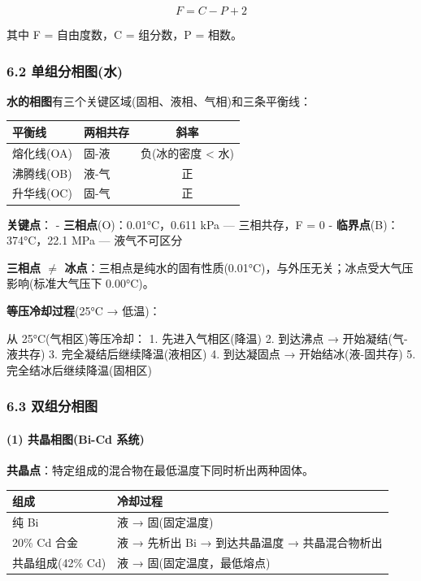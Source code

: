 \[
\boxed{F = C - P + 2}
\]

其中 F = 自由度数，C = 组分数，P = 相数。

\subsubsection{6.2 单组分相图(水)}\label{ux5355ux7ec4ux5206ux76f8ux56feux6c34}

\textbf{水的相图}有三个关键区域(固相、液相、气相)和三条平衡线：

{\def\LTcaptype{none} %
\begin{longtable}[]{@{}llc@{}}
\toprule\noalign{}
平衡线 & 两相共存 & 斜率 \\
\midrule\noalign{}
\endhead
\bottomrule\noalign{}
\endlastfoot
熔化线(OA) & 固-液 & 负(冰的密度 \textless{} 水) \\
沸腾线(OB) & 液-气 & 正 \\
升华线(OC) & 固-气 & 正 \\
\end{longtable}
}

\textbf{关键点}：
- \textbf{三相点}(O)：0.01°C，0.611 kPa --- 三相共存，F = 0
- \textbf{临界点}(B)：374°C，22.1 MPa --- 液气不可区分

\textbf{三相点 \(\neq\) 冰点}：三相点是纯水的固有性质(0.01°C)，与外压无关；冰点受大气压影响(标准大气压下 0.00°C)。

\textbf{等压冷却过程}(25°C → 低温)：

从 25°C(气相区)等压冷却：
1. 先进入气相区(降温)
2. 到达沸点 → 开始凝结(气-液共存)
3. 完全凝结后继续降温(液相区)
4. 到达凝固点 → 开始结冰(液-固共存)
5. 完全结冰后继续降温(固相区)

\subsubsection{6.3 双组分相图}\label{ux53ccux7ec4ux5206ux76f8ux56fe}

\paragraph{(1) 共晶相图(Bi-Cd 系统)}\label{ux5171ux6676ux76f8ux56febi-cd-ux7cfbux7edf}

\textbf{共晶点}：特定组成的混合物在最低温度下同时析出两种固体。

{\def\LTcaptype{none} %
\begin{longtable}[]{@{}ll@{}}
\toprule\noalign{}
组成 & 冷却过程 \\
\midrule\noalign{}
\endhead
\bottomrule\noalign{}
\endlastfoot
纯 Bi & 液 → 固(固定温度) \\
20\% Cd 合金 & 液 → 先析出 Bi → 到达共晶温度 → 共晶混合物析出 \\
共晶组成(42\% Cd) & 液 → 固(固定温度，最低熔点) \\
\end{longtable}
}


